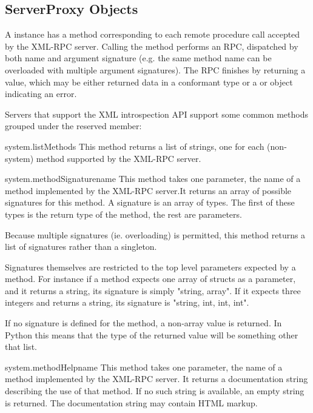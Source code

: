 \subsection{ServerProxy Objects \label{serverproxy-objects}}

A  instance has a method corresponding to
each remote procedure call accepted by the XML-RPC server.  Calling
the method performs an RPC, dispatched by both name and argument
signature (e.g. the same method name can be overloaded with multiple
argument signatures).  The RPC finishes by returning a value, which
may be either returned data in a conformant type or a  or
 object indicating an error.

Servers that support the XML introspection API support some common
methods grouped under the reserved  member:

\begin{methoddesc}{system.listMethods}{}
This method returns a list of strings, one for each (non-system)
method supported by the XML-RPC server.
\end{methoddesc}

\begin{methoddesc}{system.methodSignature}{name}
This method takes one parameter, the name of a method implemented by
the XML-RPC server.It returns an array of possible signatures for this
method. A signature is an array of types. The first of these types is
the return type of the method, the rest are parameters.

Because multiple signatures (ie. overloading) is permitted, this method
returns a list of signatures rather than a singleton.

Signatures themselves are restricted to the top level parameters
expected by a method. For instance if a method expects one array of
structs as a parameter, and it returns a string, its signature is
simply "string, array". If it expects three integers and returns a
string, its signature is "string, int, int, int".

If no signature is defined for the method, a non-array value is
returned. In Python this means that the type of the returned 
value will be something other that list.
\end{methoddesc}

\begin{methoddesc}{system.methodHelp}{name}
This method takes one parameter, the name of a method implemented by
the XML-RPC server.  It returns a documentation string describing the
use of that method. If no such string is available, an empty string is
returned. The documentation string may contain HTML markup.  
\end{methoddesc}

